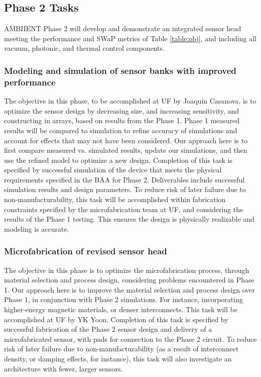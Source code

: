 \subsection{Phase 2 Tasks}
  
AMBIIENT Phase 2 will develop and demonstrate an integrated sensor head meeting the
performance and SWaP metrics of Table \ref{table:obj}, and including all vacuum, photonic, and thermal
control components.

\subsubsection{Modeling and simulation of sensor banks with improved performance}\label{sec:p2:em}

The objective in this phase, to be accomplished at UF by Joaquin Casanova, is to optimize the sensor design by decreasing size, and increasing sensitivity, and constructing in arrays, based on results from the Phase 1. Phase 1 measured results will be compared to simulation to refine accuracy of simulations and account for effects that may not have been considered. Our approach here is to first compare measured vs. simulated results, update our simulations, and then use the refined model to optimize a new design. Completion of this task is specified by successful simulation of the device that meets the physical requirements specified in the BAA for Phase 2. Deliverables include successful simulation results and design parameters. To reduce risk of later failure due to non-manufacturability, this task will be accomplished within fabrication constraints specified by the microfabrication team at UF, and considering the results of the Phase 1 testing. This ensures the design is physically realizable and modeling is accurate.

\subsubsection{Microfabrication of revised sensor head}\label{sec:p2:mf}

The objective in this phase is to optimize the microfabrication process, through material selection and process design, considering problems encountered in Phase 1. Our approach here is to improve the material selection and process design over Phase 1, in conjunction with Phase 2 simulations. For instance, incorporating higher-energy magnetic materials, or denser interconnects. This task will be accomplished at UF by YK Yoon. Completion of this task is specified by successful fabrication of the Phase 2 sensor design and delivery of a microfabricated sensor, with pads for connection to the Phase 2 circuit. To reduce risk of later failure due to non-manufacturability (as a result of interconnect density, or damping effects, for instance), this task will also investigate an architecture with fewer, larger sensors.

